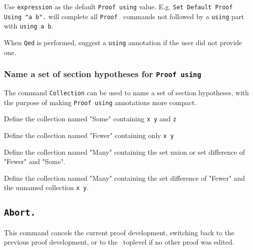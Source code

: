 
  Use {\tt expression} as the default {\tt Proof using} value.
  E.g. {\tt Set Default Proof Using "a b".} will complete all {\tt Proof }
  commands not followed by a {\tt using} part with {\tt using a b}.


  When {\tt Qed} is performed, suggest a {\tt using} annotation if
  the user did not provide one.

% 
% 
\subsubsection[\tt Collection]{Name a set of section hypotheses for {\tt Proof using}}
\label{Collection}

The command {\tt Collection} can be used to name a set of section hypotheses,
with the purpose of making {\tt Proof using} annotations more compact.


  Define the collection named "Some" containing {\tt x y} and {\tt z} 

  
  Define the collection named "Fewer" containing only {\tt x y} 

  
  Define the collection named "Many" containing the set union or set difference
  of "Fewer" and "Some".


  Define the collection named "Many" containing the set difference
  of "Fewer" and the unnamed collection {\tt x y}.

\subsection[\tt Abort.]{\tt Abort.}

This command cancels the current proof development, switching back to
the previous proof development, or to the \Coq\ toplevel if no other
proof was edited.

